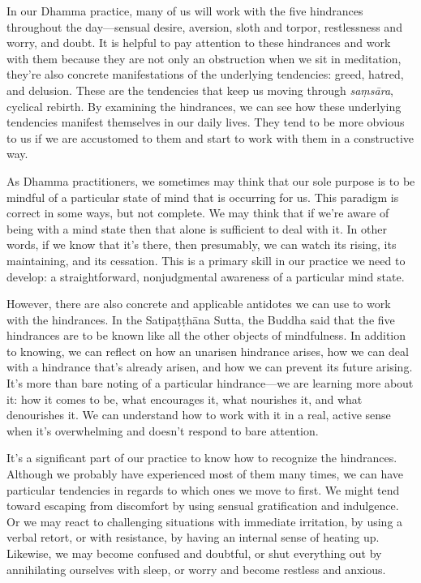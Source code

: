 
In our Dhamma practice, many of us will work with the five hindrances 
throughout the day---sensual desire, aversion, sloth and torpor, 
restlessness and worry, and doubt. It is helpful to pay attention to 
these hindrances and work with them because they are not only an 
obstruction when we sit in meditation, they're also concrete 
manifestations of the underlying tendencies: greed, hatred, and 
delusion. These are the tendencies that keep us moving through 
\emph{saṃsāra}, cyclical rebirth. By examining the hindrances, we 
can see how these underlying tendencies manifest themselves in our 
daily lives. They tend to be more obvious to us if we are accustomed to 
them and start to work with them in a constructive way.

As Dhamma practitioners, we sometimes may think that our sole purpose 
is to be mindful of a particular state of mind that is occurring for 
us. This paradigm is correct in some ways, but not complete. We may 
think that if we're aware of being with a mind state then that alone is 
sufficient to deal with it. In other words, if we know that it's there, 
then presumably, we can watch its rising, its maintaining, and its 
cessation. This is a primary skill in our practice we need to develop: 
a straightforward, nonjudgmental awareness of a particular mind state.

However, there are also concrete and applicable antidotes we can use to 
work with the hindrances. In the Satipaṭṭhāna Sutta, the Buddha 
said that the five hindrances are to be known like all the other 
objects of mindfulness. In addition to knowing, we can reflect on how 
an unarisen hindrance arises, how we can deal with a hindrance that's 
already arisen, and how we can prevent its future arising. It's more 
than bare noting of a particular hindrance---we are learning more about 
it: how it comes to be, what encourages it, what nourishes it, and what 
denourishes it. We can understand how to work with it in a real, active 
sense when it's overwhelming and doesn't respond to bare attention.

It's a significant part of our practice to know how to recognize the 
hindrances. Although we probably have experienced most of them many 
times, we can have particular tendencies in regards to which ones we 
move to first. We might tend toward escaping from discomfort by using 
sensual gratification and indulgence. Or we may react to challenging 
situations with immediate irritation, by using a verbal retort, or with 
resistance, by having an internal sense of heating up. Likewise, we may 
become confused and doubtful, or shut everything out by annihilating 
ourselves with sleep, or worry and become restless and anxious.

